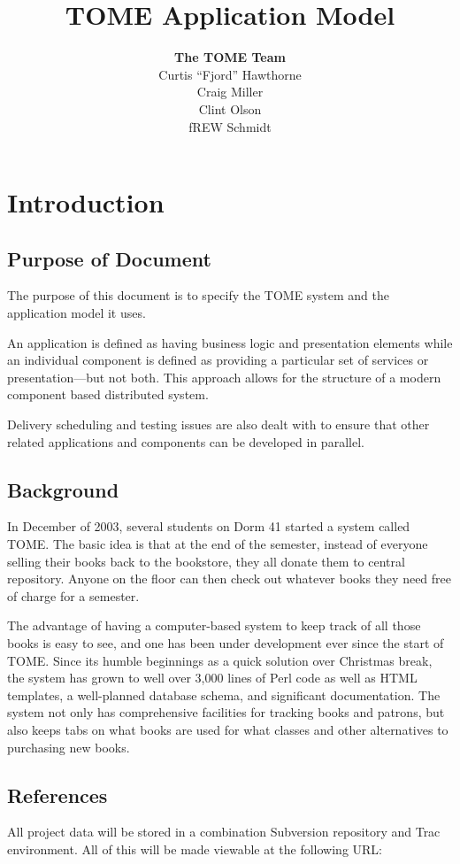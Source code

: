 \documentclass[12pt,titlepage]{article}
\author{\textbf{The TOME Team}\\
Curtis ``Fjord'' Hawthorne \\
Craig Miller\\
Clint Olson\\
fREW Schmidt
}
\title{\textbf{TOME Application Model}}
\begin{document}
\maketitle
\tableofcontents
\listoffigures
\newpage
\section{Introduction}
\subsection{Purpose of Document}
The purpose of this document is to specify the TOME system and the application model it uses.

An application is defined as having business logic and presentation elements while an individual component is defined as providing a particular set of services or presentation---but not both. This approach allows for the structure of a modern component based distributed system.

Delivery scheduling and testing issues are also dealt with to ensure that other related applications and components can be developed in parallel.
\subsection{Background}
In December of 2003, several students on Dorm 41 started a system called TOME.  The basic idea is that at the end of the semester, instead of everyone selling their books back to the bookstore, they all donate them to central repository.  Anyone on the floor can then check out whatever books they need free of charge for a semester.

The advantage of having a computer-based system to keep track of all those books is easy to see, and one has been under development ever since the start of TOME.  Since its humble beginnings as a quick solution over Christmas break, the system has grown to well over 3,000 lines of Perl code as well as HTML templates, a well-planned database schema, and significant documentation.  The system not only has comprehensive facilities for tracking books and patrons, but also keeps tabs on what books are used for what classes and other alternatives to purchasing new books.
\subsection{References}
\label{references}
All project data will be stored in a combination Subversion repository and Trac environment.  All of this will be made viewable at the following URL:
\end{document}
